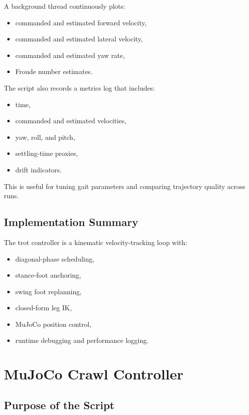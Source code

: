 \documentclass[11pt,a4paper]{report}
\begin{document}
A background thread continuously plots:
\begin{itemize}
    \item commanded and estimated forward velocity,
    \item commanded and estimated lateral velocity,
    \item commanded and estimated yaw rate,
    \item Froude number estimates.
\end{itemize}

The script also records a metrics log that includes:
\begin{itemize}
    \item time,
    \item commanded and estimated velocities,
    \item yaw, roll, and pitch,
    \item settling-time proxies,
    \item drift indicators.
\end{itemize}

This is useful for tuning gait parameters and comparing trajectory quality across runs.

\section{Implementation Summary}

The trot controller is a kinematic velocity-tracking loop with:
\begin{itemize}
    \item diagonal-phase scheduling,
    \item stance-foot anchoring,
    \item swing foot replanning,
    \item closed-form leg IK,
    \item MuJoCo position control,
    \item runtime debugging and performance logging.
\end{itemize}

\chapter{MuJoCo Crawl Controller}

\section{Purpose of the Script}
\end{document}
